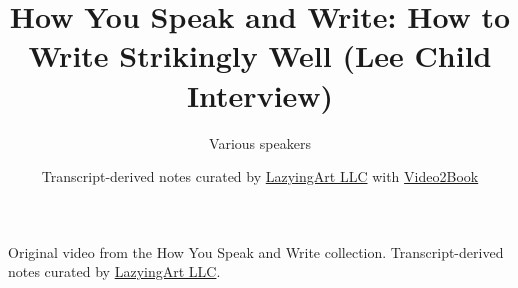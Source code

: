 \documentclass[11pt,oneside]{book}
\begin{document}
\frontmatter
\title{How You Speak and Write: How to Write Strikingly Well (Lee Child Interview)}
\author{Various speakers}
\date{Transcript-derived notes curated by \href{https://lazying.art}{LazyingArt LLC} with \href{https://github.com/lachlanchen/Video2Book}{Video2Book}}
\maketitle
\begin{center}
\small Original video from the How You Speak and Write collection. Transcript-derived notes curated by \href{https://lazying.art}{LazyingArt LLC}.
\end{center}
\clearpage
\mainmatter

\end{document}
